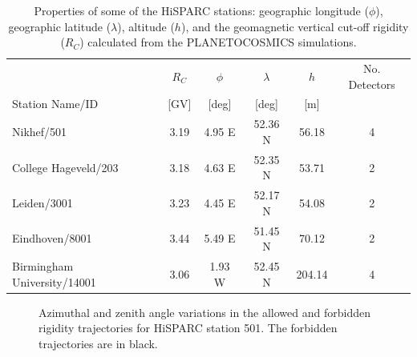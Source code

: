 \begin{table}
	\begin{center}
		\caption{Properties of some of the HiSPARC stations: geographic longitude ($\phi$), geographic latitude ($\lambda$), altitude ($h$), and the geomagnetic vertical cut-off rigidity ($R_C$) calculated from the PLANETOCOSMICS simulations.}
		\label{tab:HS_stns}
		\begin{tabular}{l c c c c c}
			\hline
			& $R_C$  & $\phi$ & $\lambda$  & $h$  & No. Detectors\\
			Station Name/ID & [GV] & [deg] & [deg] & [m]  & \\
			\hline
			Nikhef/501 & 3.19 & 4.95 E & 52.36 N & 56.18 & 4 \\
			College Hageveld/203 & 3.18 & 4.63 E  & 52.35 N & 53.71  & 2 \\
			Leiden/3001 & 3.23 & 4.45 E & 52.17 N & 54.08 & 2 \\
			Eindhoven/8001  & 3.44 & 5.49 E & 51.45 N & 70.12 & 2 \\
			Birmingham University/14001  & 3.06 & 1.93 W & 52.45 N & 204.14 & 4  \\
			\hline
		\end{tabular}
	\end{center}
\end{table}

\begin{figure}[h]
	\centering
	
	\caption{Azimuthal and zenith angle variations in the allowed and forbidden rigidity trajectories for HiSPARC station 501. The forbidden trajectories are in black.}
	\label{fig:R_C2}
\end{figure}

